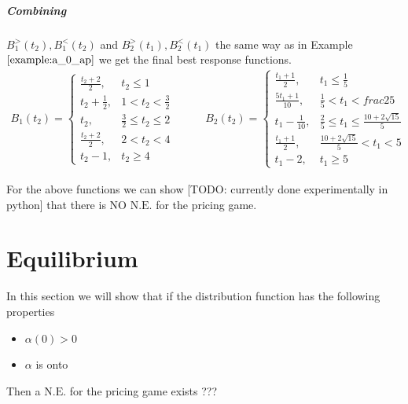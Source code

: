 \documentclass[10pt,a4paper]{book}
\newcommand{\NE}{\mathrm{N.E.}}
\theoremstyle{definition}
\theoremstyle{comment}
\begin{document}
\subparagraph{Combining} $B_1^>(t_2), B_1^<(t_2)$ and $B_2^>(t_1), B_2^<(t_1)$ the same way as in Example $\ref{example:a_0_ap}$ we get the final best response functions.
\begin{equation*}
	\begin{aligned}
		B_1(t_2) =
		\begin{cases}
			\frac{t_2 + 2}2, & t_2 \le 1 \\
			t_2 + \frac12, & 1 < t_2 < \frac32 \\
			t_2, & \frac32 \le t_2 \le 2 \\
			\frac{t_2 + 2}2, & 2 < t_2 < 4 \\
			t_2 - 1, & t_2 \ge 4
		\end{cases}
	\end{aligned}
	\qquad
	\begin{aligned}
		B_2(t_2) =
		\begin{cases}
			\frac{t_1 + 1}2, & t_1 \le \frac15 \\
			\frac{5 t_1 + 1}{10}, & \frac15 < t_1 < frac25 \\
			t_1 - \frac1{10}, & \frac25 \le t_1 \le \frac{10 + 2 \sqrt{15}}5 \\
			\frac{t_1 + 1}2, & \frac{10 + 2 \sqrt{15}}5 < t_1 < 5 \\
			t_1 - 2, & t_1 \ge 5
		\end{cases}
	\end{aligned}
\end{equation*}

For the above functions we can show [TODO: currently done experimentally in python] that there is NO $\NE$ for the pricing game.


\section{Equilibrium}

In this section we will show that if the distribution function has the following properties
\begin{itemize}
	\item $\alpha(0) > 0$
	\item $\alpha$ is onto
\end{itemize}
Then a $\NE$ for the pricing game exists ???


\cleardoublepage
{}
{}




\end{document}
